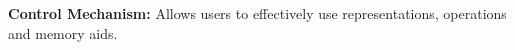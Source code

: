 \textbf{Control Mechanism: }Allows users to effectively use representations, operations and memory aids.\cite{DSS}\\
